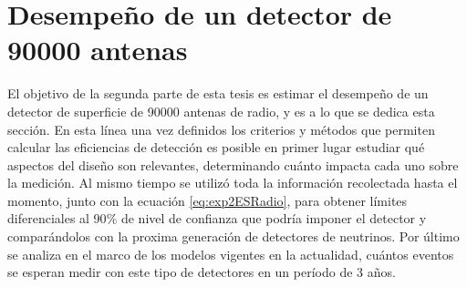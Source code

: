 



% 
% 	

	
\section{Desempe\~no de un detector de 90000 antenas}
	
	El objetivo de la segunda parte de esta tesis es estimar el desempe\~no de un detector de superficie de 90000 antenas de radio, y es a lo que se dedica esta secci\'on.
	En esta l\'inea una vez definidos los criterios y m\'etodos que permiten calcular las eficiencias de detecci\'on es posible en primer lugar estudiar qu\'e aspectos del dise\~no son relevantes, determinando cu\'anto impacta cada uno sobre la medici\'on.
	Al mismo tiempo se utiliz\'o toda la informaci\'on recolectada hasta el momento, junto con la ecuaci\'on \ref{eq:exp2ESRadio}, para obtener l\'imites diferenciales al 90$\%$ de nivel de confianza que podr\'ia imponer el detector y compar\'andolos con la proxima generaci\'on de detectores de neutrinos.
	Por \'ultimo se analiza en el marco de los modelos vigentes en la actualidad, cu\'antos eventos se esperan medir con este tipo de detectores en un per\'iodo de 3 a\~nos.
	
